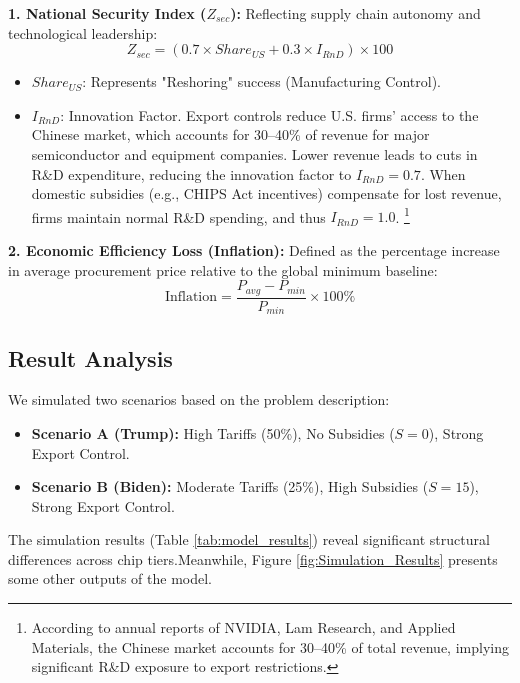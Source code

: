\documentclass{apmcmthesis}
\begin{document}
\textbf{1. National Security Index ($Z_{sec}$):}
Reflecting supply chain autonomy and technological leadership:
\begin{equation}
    Z_{sec} = (0.7 \times Share_{US} + 0.3 \times I_{RnD}) \times 100
\end{equation}
\begin{itemize}
    \item $Share_{US}$: Represents "Reshoring" success (Manufacturing Control).
    \item $I_{RnD}$: Innovation Factor. Export controls reduce U.S. firms’ access to the
Chinese market, which accounts for 30--40\% of revenue for major semiconductor
and equipment companies. Lower revenue leads to cuts in R\&D expenditure,
reducing the innovation factor to $I_{RnD} = 0.7$. When domestic subsidies
(e.g., CHIPS Act incentives) compensate for lost revenue, firms maintain normal
R\&D spending, and thus $I_{RnD} = 1.0$.
\footnote{According to annual reports of NVIDIA, Lam Research, and Applied Materials, 
the Chinese market accounts for 30--40\% of total revenue, implying significant
R\&D exposure to export restrictions.}


\end{itemize}

\textbf{2. Economic Efficiency Loss (Inflation):}
Defined as the percentage increase in average procurement price relative to the global minimum baseline:
\begin{equation}
    \text{Inflation} = \frac{P_{avg} - P_{min}}{P_{min}} \times 100\%
\end{equation}

\subsection{Result Analysis}
We simulated two scenarios based on the problem description:
\begin{itemize}
    \item \textbf{Scenario A (Trump):} High Tariffs (50\%), No Subsidies ($S=0$), Strong Export Control.
    \item \textbf{Scenario B (Biden):} Moderate Tariffs (25\%), High Subsidies ($S=15$), Strong Export Control.
\end{itemize}

The simulation results (Table \ref{tab:model_results}) reveal significant structural differences across chip tiers.Meanwhile, Figure \ref{fig:Simulation_Results} presents some other outputs of the model.
\end{document}
